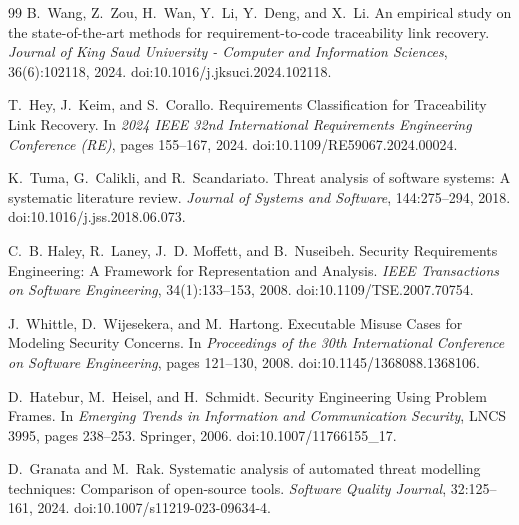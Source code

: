 \documentclass[12pt,a4paper,oneside]{report}
\begin{document}
\begin{thebibliography}{99}
B.~Wang, Z.~Zou, H.~Wan, Y.~Li, Y.~Deng, and X.~Li.
\newblock An empirical study on the state-of-the-art methods for requirement-to-code traceability link recovery.
\newblock \emph{Journal of King Saud University - Computer and Information Sciences}, 36(6):102118, 2024.
\newblock doi:10.1016/j.jksuci.2024.102118.

T.~Hey, J.~Keim, and S.~Corallo.
\newblock Requirements Classification for Traceability Link Recovery.
\newblock In \emph{2024 IEEE 32nd International Requirements Engineering Conference (RE)}, pages 155--167, 2024.
\newblock doi:10.1109/RE59067.2024.00024.

K.~Tuma, G.~Calikli, and R.~Scandariato.
\newblock Threat analysis of software systems: A systematic literature review.
\newblock \emph{Journal of Systems and Software}, 144:275--294, 2018.
\newblock doi:10.1016/j.jss.2018.06.073.

C.~B. Haley, R.~Laney, J.~D. Moffett, and B.~Nuseibeh.
\newblock Security Requirements Engineering: A Framework for Representation and Analysis.
\newblock \emph{IEEE Transactions on Software Engineering}, 34(1):133--153, 2008.
\newblock doi:10.1109/TSE.2007.70754.

J.~Whittle, D.~Wijesekera, and M.~Hartong.
\newblock Executable Misuse Cases for Modeling Security Concerns.
\newblock In \emph{Proceedings of the 30th International Conference on Software Engineering}, pages 121--130, 2008.
\newblock doi:10.1145/1368088.1368106.

D.~Hatebur, M.~Heisel, and H.~Schmidt.
\newblock Security Engineering Using Problem Frames.
\newblock In \emph{Emerging Trends in Information and Communication Security}, LNCS 3995, pages 238--253. Springer, 2006.
\newblock doi:10.1007/11766155\_17.

D.~Granata and M.~Rak.
\newblock Systematic analysis of automated threat modelling techniques: Comparison of open-source tools.
\newblock \emph{Software Quality Journal}, 32:125--161, 2024.
\newblock doi:10.1007/s11219-023-09634-4.


\end{thebibliography}
\end{document}

